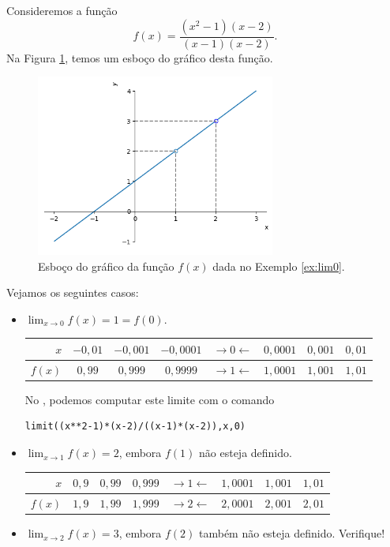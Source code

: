\begin{ex}\label{ex:lim0}
  Consideremos a função
  \begin{equation}
    f(x) = \frac{(x^2-1)(x-2)}{(x-1)(x-2)}.
  \end{equation}
  Na Figura \ref{fig:ex_lim0}, temos um esboço do gráfico desta função.

  \begin{figure}[H]
    \centering
    \includegraphics[width=0.7\textwidth]{./cap_lim/dados/fig_ex_lim0/fig_ex_lim0}
    \caption{Esboço do gráfico da função $f(x)$ dada no Exemplo \ref{ex:lim0}.}
    \label{fig:ex_lim0}
  \end{figure}


  Vejamos os seguintes casos:
  \begin{itemize}
  \item $\displaystyle \lim_{x\to 0} f(x) = 1 = f(0)$.
    
    \begin{tabular}{r|ccc|c|ccc}
      $x$ & $-0,01$ & $-0,001$ & $-0,0001$ & $\rightarrow 0 \leftarrow$ & $0,0001$ & $0,001$ & $0,01$\\\hline
      $f(x)$ & $0,99$ & $0,999$ & $0,9999$ & $\rightarrow 1 \leftarrow$ & $1,0001$ & $1,001$ & $1,01$
    \end{tabular}

    \ifispython
    No \sympy, podemos computar este limite com o comando
\begin{verbatim}
limit((x**2-1)*(x-2)/((x-1)*(x-2)),x,0)
\end{verbatim}
    \fi
  \item $\displaystyle \lim_{x\to 1} f(x) = 2$, embora $f(1)$ não esteja definido.
    
    \begin{tabular}{r|ccc|c|ccc}
      $x$ & $0,9$ & $0,99$ & $0,999$ & $\rightarrow 1 \leftarrow$ & $1,0001$ & $1,001$ & $1,01$\\\hline
      $f(x)$ & $1,9$ & $1,99$ & $1,999$ & $\rightarrow 2 \leftarrow$ & $2,0001$ & $2,001$ & $2,01$
    \end{tabular}
  \item $\displaystyle \lim_{x\to 2} f(x) = 3$, embora $f(2)$ também não esteja definido. Verifique!
  \end{itemize}
\end{ex}

